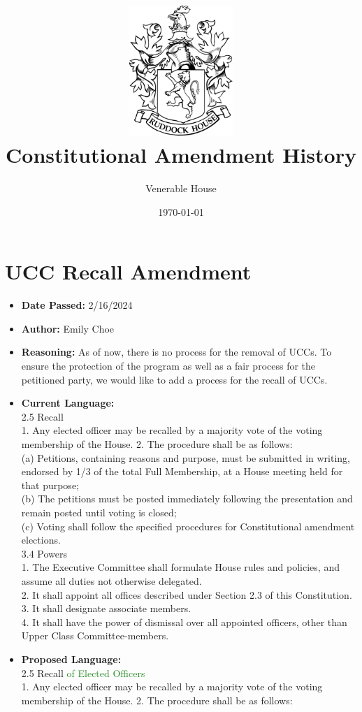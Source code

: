 \documentclass[10pt]{article} %
\title{\includegraphics[width=1.55in]{venerable_crest.png} \\ Constitutional Amendment History}
\author{Venerable House}
\date{\today} %
\begin{document}
\maketitle

\section{UCC Recall Amendment}
\begin{itemize}
	\item \textbf{Date Passed:} 2/16/2024
	\item \textbf{Author:} Emily Choe
	\item \textbf{Reasoning:} As of now, there is no process for the removal of UCCs. To ensure the protection of the program as well as a fair process for the petitioned party, we would like to add a process for the recall of UCCs.
	\item \textbf{Current Language:} \\
	2.5 Recall \\
	1. Any elected officer may be recalled by a majority vote of the voting membership of the House. 2. The procedure shall be as follows: \\
	(a) Petitions, containing reasons and purpose, must be submitted in writing, endorsed by 1/3 of the total Full Membership, at a House meeting held for that purpose; \\
	(b) The petitions must be posted immediately following the presentation and remain posted until voting is closed; \\
	(c) Voting shall follow the specified procedures for Constitutional amendment elections. \\
	3.4 Powers \\
	1. The Executive Committee shall formulate House rules and policies, and assume all duties not otherwise delegated. \\
	2. It shall appoint all offices described under Section 2.3 of this Constitution. \\
	3. It shall designate associate members. \\
	4. It shall have the power of dismissal over all appointed officers, other than Upper Class Committee-members.
	\item \textbf{Proposed Language:} \\
	2.5 Recall \textcolor{ForestGreen}{of Elected Officers} \\
	1. Any elected officer may be recalled by a majority vote of the voting membership of the House. 2. The procedure shall be as follows: \\

\end{itemize}
\end{document}
